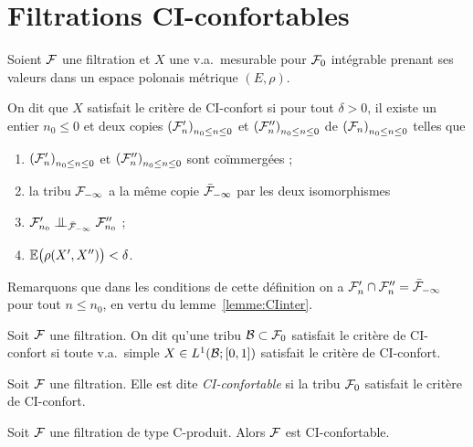 \documentclass[12pt,a4paper]{article}
\begin{document}
\section{Filtrations CI-confortables}

\begin{definition}\label{def:CIconfort}
Soient $\mathcal{F}$ une filtration et $X$ une v.a.\ mesurable pour $\mathcal{F}_0$ 
intégrable prenant ses valeurs dans un espace polonais métrique $(E,\rho)$. 

On dit que $X$ satisfait le critère de CI-confort si pour tout $\delta>0$, 
il existe un entier $n_0 \leq 0$ et deux copies  ${(\mathcal{F}'_n)}_{n_0 \leq n \leq 0}$ et 
${(\mathcal{F}''_n)}_{n_0 \leq n \leq 0}$ de 
${(\mathcal{F}_n)}_{n_0 \leq n \leq 0}$ telles que 
\begin{enumerate}
\item  ${(\mathcal{F}'_n)}_{n_0 \leq n \leq 0}$ et 
${(\mathcal{F}''_n)}_{n_0 \leq n \leq 0}$  sont co\"immergées ;

\item la tribu $\mathcal{F}_{-\infty}$ a la m\^eme copie $\bar{\mathcal{F}}_{-\infty}$ par les 
deux isomorphismes 

\item $\FF'_{n_0} \indep_{\bar\FF_{-\infty}} \FF''_{n_0}$ ;

\item $\mathbb{E}\bigl(\rho(X', X'')\bigr) < \delta$.
\end{enumerate}
\end{definition}

Remarquons que dans les conditions de cette définition on 
a $\mathcal{F}'_{n}\cap\mathcal{F}''_{n} = \bar{\mathcal{F}}_{-\infty}$ pour tout $n \leq n_0$, en vertu du lemme~\ref{lemme:CIinter}.

\begin{definition}
Soit $\mathcal{F}$ une filtration. On dit qu'une tribu $\mathcal{B} \subset \mathcal{F}_0$ 
satisfait le critère de CI-confort si 
 toute v.a.\ simple $X \in L^1(\mathcal{B}; [0,1])$  satisfait le critère de CI-confort. 
\end{definition}

\begin{definition}
Soit $\mathcal{F}$ une filtration. Elle est dite \emph{CI-confortable} si 
la tribu $\mathcal{F}_0$  satisfait le critère de CI-confort. 
\end{definition}


\begin{ppsition}
Soit $\mathcal{F}$ une filtration de type C-produit. Alors $\mathcal{F}$ est CI-confortable.
\end{ppsition}
\end{document}
